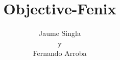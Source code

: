 \documentclass[a4paper,10pt,twoside]{report}
\title{\huge \textbf{Objective-Fenix}}
\author{Jaume Singla\\y\\Fernando Arroba}
\begin{document}

\tableofcontents
\listoftables
\listofalgorithms









\end{document}
